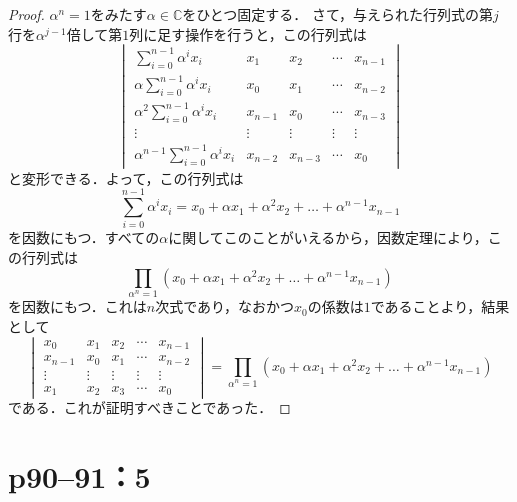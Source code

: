 \documentclass[a4paper,10pt,fleqn]{ltjsarticle}
\begin{document}
\begin{leftbar}
    \begin{proof}
        $\alpha ^n =1$をみたす$\alpha \in \mathbb{C}$をひとつ固定する．
        さて，与えられた行列式の第$j$行を$\alpha^{j-1}$倍して第$1$列に足す操作を行うと，この行列式は
        \[
            \begin{vmatrix}
                \sum_{i=0}^{n-1} \alpha^i x_i              & x_1     & x_2     & \cdots & x_{n-1} \\
                \alpha \sum_{i=0}^{n-1} \alpha^i x_i       & x_0     & x_1     & \cdots & x_{n-2} \\
                \alpha^2 \sum_{i=0}^{n-1} \alpha^i x_i     & x_{n-1} & x_0     & \cdots & x_{n-3} \\
                \vdots                                     & \vdots  & \vdots  & \vdots & \vdots  \\
                \alpha^{n-1} \sum_{i=0}^{n-1} \alpha^i x_i & x_{n-2} & x_{n-3} & \cdots & x_0
            \end{vmatrix}
        \]
        と変形できる．よって，この行列式は
        \[
            \sum_{i=0}^{n-1} \alpha^i x_i = x_0 + \alpha x_1 + \alpha^2 x_2 + \dots +\alpha^{n-1} x_{n-1}
        \]
        を因数にもつ．すべての$\alpha$に関してこのことがいえるから，因数定理により，この行列式は
        \[
            \prod_{\alpha^n=1} (x_0 + \alpha x_1 + \alpha^2 x_2 + \dots +\alpha^{n-1} x_{n-1})
        \]
        を因数にもつ．これは$n$次式であり，なおかつ$x_0$の係数は$1$であることより，結果として
        \[
            \begin{vmatrix}
                x_0     & x_1    & x_2    & \cdots & x_{n-1} \\
                x_{n-1} & x_0    & x_1    & \cdots & x_{n-2} \\
                \vdots  & \vdots & \vdots & \vdots & \vdots  \\
                x_1     & x_2    & x_3    & \cdots & x_0
            \end{vmatrix}
            =  \prod_{\alpha^n=1} (x_0 + \alpha x_1 + \alpha^2 x_2 + \dots +\alpha^{n-1} x_{n-1})
        \]
        である．これが証明すべきことであった．
    \end{proof}
\end{leftbar}


\section*{p90--91：5}
\end{document}
